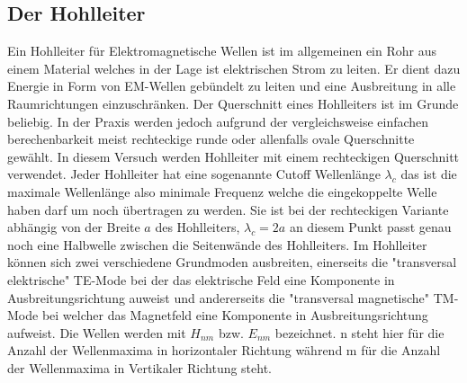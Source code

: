 \subsection{Der Hohlleiter}
\label{sec:thwellenleiter}
Ein Hohlleiter für Elektromagnetische Wellen ist im allgemeinen ein Rohr aus einem Material welches in der 
Lage ist elektrischen Strom zu leiten. Er dient dazu Energie in Form von EM-Wellen gebündelt zu leiten und
eine Ausbreitung in alle Raumrichtungen einzuschränken. Der Querschnitt eines Hohlleiters ist im Grunde 
beliebig. In der Praxis werden jedoch aufgrund der vergleichsweise einfachen berechenbarkeit meist rechteckige
runde oder allenfalls ovale Querschnitte gewählt. In diesem Versuch werden Hohlleiter mit einem rechteckigen
Querschnitt verwendet. Jeder Hohlleiter hat eine sogenannte Cutoff Wellenlänge $\lambda_c$ das ist die maximale
Wellenlänge also minimale Frequenz welche die eingekoppelte Welle haben darf um noch übertragen zu werden.
Sie ist bei der rechteckigen Variante abhängig von der Breite $a$ des Hohlleiters, $\lambda_c=2a$ an diesem Punkt
passt genau noch eine Halbwelle zwischen die Seitenwände des Hohlleiters. Im Hohlleiter können sich zwei verschiedene
Grundmoden ausbreiten, einerseits die "transversal elektrische" TE-Mode bei der das elektrische Feld eine Komponente
in Ausbreitungsrichtung auweist und andererseits die "transversal magnetische" TM-Mode bei welcher das Magnetfeld
eine Komponente in Ausbreitungsrichtung aufweist. Die Wellen werden mit $H_{nm}$ bzw. $E_{nm}$
bezeichnet. n steht hier für die Anzahl der Wellenmaxima in horizontaler Richtung während m für die Anzahl der 
Wellenmaxima in Vertikaler Richtung steht.

